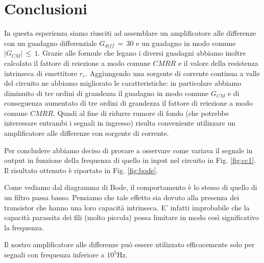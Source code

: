 \section{Conclusioni}

In questa esperienza siamo riusciti ad assemblare un amplificatore alle differenze con un guadagno differenziale $G_{diff} \,=\, 30$ e un guadagno in modo comune $\left| G_{CM} \right| \,\leq\, 1$.
Grazie alle formule che legano i diversi guadagni abbiamo inoltre calcolato il fattore di reiezione a modo comune $CMRR$ e il valore della resistenza intrinseca di emettitore $r_e$.
Aggiungendo una sorgente di corrente continua a valle del circuito ne abbiamo migliorato le caratteristiche: in particolare abbiamo diminuito di tre ordini di grandezza il guadagno in modo comune $G_{CM}$ e di conseguenza aumentato di tre ordini di grandezza il fattore di reiezione a modo comune $CMRR$. Qundi al fine di ridurre rumore di fondo (che potrebbe interessare entrambi i segnali in ingresso) risulta conveniente utilizzare un amplificatore alle differenze con sorgente di corrente.
%

Per concludere abbiamo deciso di provare a osservare come variava il segnale in  output in funzione della frequenza di quello in input nel circuito in Fig. \ref{fig:cc1}. Il risultato ottenuto è riportato in Fig. \ref{fig:bode}.

Come vediamo dal diagramma di Bode, il comportamento è lo stesso di quello di un filtro passa basso. Pensiamo che tale effetto sia dovuto alla presenza dei transistor che hanno una loro capacità intrinseca. E' infatti improbabile che la capacità parassita dei fili (molto piccola) possa limitare in modo così significativo la frequenza.  

Il nostro amplificatore alle differenze può essere utilizzato efficacemente solo per segnali con frequenza inferiore a $10^5\si{\hertz}$.


